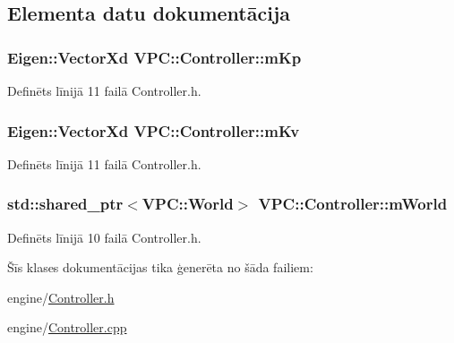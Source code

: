 \subsection{Elementa datu dokumentācija}
\subsubsection[{\texorpdfstring{m\+Kp}{mKp}}]{\setlength{\rightskip}{0pt plus 5cm}Eigen\+::\+Vector\+Xd V\+P\+C\+::\+Controller\+::m\+Kp\hspace{0.3cm}{\ttfamily [private]}}\hypertarget{class_v_p_c_1_1_controller_a88da6e3301abaeb5b63fd1519fb67cb1}{}\label{class_v_p_c_1_1_controller_a88da6e3301abaeb5b63fd1519fb67cb1}


Definēts līnijā 11 failā Controller.\+h.

\subsubsection[{\texorpdfstring{m\+Kv}{mKv}}]{\setlength{\rightskip}{0pt plus 5cm}Eigen\+::\+Vector\+Xd V\+P\+C\+::\+Controller\+::m\+Kv\hspace{0.3cm}{\ttfamily [private]}}\hypertarget{class_v_p_c_1_1_controller_a6c4a4f388d7ee81f2519e4b05f653f9d}{}\label{class_v_p_c_1_1_controller_a6c4a4f388d7ee81f2519e4b05f653f9d}


Definēts līnijā 11 failā Controller.\+h.

\subsubsection[{\texorpdfstring{m\+World}{mWorld}}]{\setlength{\rightskip}{0pt plus 5cm}std\+::shared\+\_\+ptr$<${\bf V\+P\+C\+::\+World}$>$ V\+P\+C\+::\+Controller\+::m\+World\hspace{0.3cm}{\ttfamily [private]}}\hypertarget{class_v_p_c_1_1_controller_a9c46fee9b19ef4f4d79726717f923586}{}\label{class_v_p_c_1_1_controller_a9c46fee9b19ef4f4d79726717f923586}


Definēts līnijā 10 failā Controller.\+h.



Šīs klases dokumentācijas tika ģenerēta no šāda failiem\+:\begin{DoxyCompactItemize}
\item 
engine/\hyperlink{_controller_8h}{Controller.\+h}\item 
engine/\hyperlink{_controller_8cpp}{Controller.\+cpp}\end{DoxyCompactItemize}
